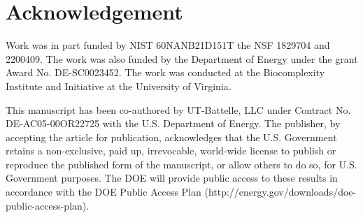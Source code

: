 \section*{Acknowledgement}

Work was in part funded by NIST 60NANB21D151T  the NSF 1829704 and 2200409.  The work was also funded by the Department of Energy under the grant Award No. DE-SC0023452. The work was conducted at the Biocomplexity Institute and Initiative at the University of Virginia.

This manuscript has been co-authored by UT-Battelle, LLC under Contract No. DE-AC05-00OR22725 with the U.S. Department of Energy. The publisher, by accepting the article for publication, acknowledges that the U.S. Government retains a non-exclusive, paid up, irrevocable, world-wide license to publish or reproduce the published form of the manuscript, or allow others to do so, for U.S. Government purposes. The DOE will provide public access to these results in accordance with the DOE Public Access Plan (http://energy.gov/downloads/doe-public-access-plan).

